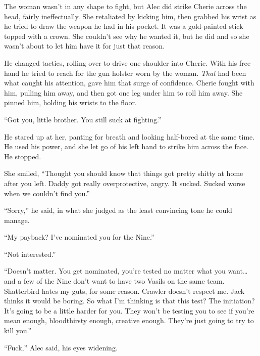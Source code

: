 The woman wasn't in any shape to fight, but Alec did strike Cherie across the head, fairly ineffectually.  She retaliated by kicking him, then grabbed his wrist as he tried to draw the weapon he had in his pocket.  It was a gold-painted stick topped with a crown.  She couldn't see why he wanted it, but he did and so she wasn't about to let him have it for just that reason.



He changed tactics, rolling over to drive one shoulder into Cherie.  With his free hand he tried to reach for the gun holster worn by the woman.  \emph{That} had been what caught his attention, gave him that surge of confidence.  Cherie fought with him, pulling him away, and then got one leg under him to roll him away.  She pinned him, holding his wrists to the floor.



``Got you, little brother.  You still suck at fighting.''



He stared up at her, panting for breath and looking half-bored at the same time.  He used his power, and she let go of his left hand to strike him across the face.  He stopped.



She smiled, ``Thought you should know that things got pretty shitty at home after you left.  Daddy got really overprotective, angry.  It sucked.  Sucked worse when we couldn't find you.''



``Sorry,'' he said, in what she judged as the least convincing tone he could manage.



``My payback?  I've nominated you for the Nine.''



``Not interested.''



``Doesn't matter.  You get nominated, you're tested no matter what you want\ldots and a few of the Nine don't want to have two Vasils on the same team.  Shatterbird hates my guts, for some reason.  Crawler doesn't respect me.  Jack thinks it would be boring.  So what I'm thinking is that this test?  The initiation?  It's going to be a little harder for you.  They won't be testing you to see if you're mean enough, bloodthirsty enough, creative enough.  They're just going to try to kill you.''



``Fuck,'' Alec said, his eyes widening.



